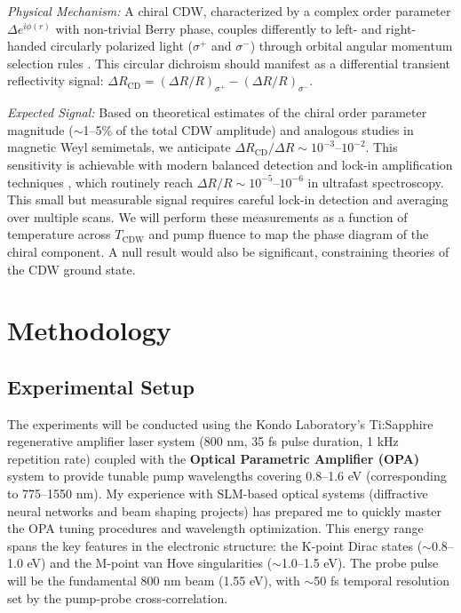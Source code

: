 \documentclass[12pt,a4paper]{article}
\begin{document}
\textit{Physical Mechanism:} A chiral CDW, characterized by a complex order parameter $\Delta e^{i\phi(r)}$ with non-trivial Berry phase, couples differently to left- and right-handed circularly polarized light ($\sigma^+$ and $\sigma^-$) through orbital angular momentum selection rules \cite{Wang2020}. This circular dichroism should manifest as a differential transient reflectivity signal: $\Delta R_{\text{CD}} = (\Delta R/R)_{\sigma^+} - (\Delta R/R)_{\sigma^-}$.

\textit{Expected Signal:} Based on theoretical estimates of the chiral order parameter magnitude ($\sim$1--5\% of the total CDW amplitude) and analogous studies in magnetic Weyl semimetals, we anticipate $\Delta R_{\text{CD}} / \Delta R \sim 10^{-3}$--$10^{-2}$. This sensitivity is achievable with modern balanced detection and lock-in amplification techniques \cite{Giannetti2016}, which routinely reach $\Delta R/R \sim 10^{-5}$--$10^{-6}$ in ultrafast spectroscopy. This small but measurable signal requires careful lock-in detection and averaging over multiple scans. We will perform these measurements as a function of temperature across $T_{\text{CDW}}$ and pump fluence to map the phase diagram of the chiral component. A null result would also be significant, constraining theories of the CDW ground state.

\section{Methodology}

\subsection{Experimental Setup}
The experiments will be conducted using the Kondo Laboratory's Ti:Sapphire regenerative amplifier laser system (800 nm, 35 fs pulse duration, 1 kHz repetition rate) coupled with the \textbf{Optical Parametric Amplifier (OPA)} system to provide tunable pump wavelengths covering 0.8--1.6 eV (corresponding to 775--1550 nm). My experience with SLM-based optical systems (diffractive neural networks and beam shaping projects) has prepared me to quickly master the OPA tuning procedures and wavelength optimization. This energy range spans the key features in the electronic structure: the K-point Dirac states ($\sim$0.8--1.0 eV) and the M-point van Hove singularities ($\sim$1.0--1.5 eV). The probe pulse will be the fundamental 800 nm beam (1.55 eV), with $\sim$50 fs temporal resolution set by the pump-probe cross-correlation.
\end{document}
